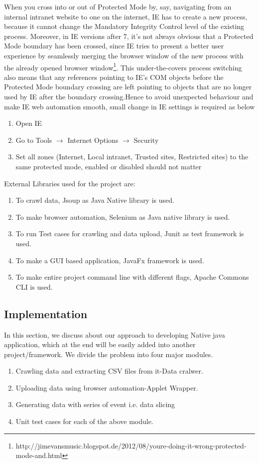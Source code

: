 \documentclass[article,type=msc,colorback,accentcolor=tud9c,twoside,11pt]{tudthesis}
\begin{document}
When you cross into or out of Protected Mode by, say, navigating from an internal intranet website to one on the internet, IE has to create a new process, because it cannot change the Mandatory Integrity Control level of the existing process. Moreover, in IE versions after 7, it's not always obvious that a Protected Mode boundary has been crossed, since IE tries to present a better user experience by seamlessly merging the browser window of the new process with the already opened browser window\footnote{http://jimevansmusic.blogspot.de/2012/08/youre-doing-it-wrong-protected-mode-and.html}. This under-the-covers process switching also means that any references pointing to IE's COM objects before the Protected Mode boundary crossing are left pointing to objects that are no longer used by IE after the boundary crossing.Hence to avoid unexpected behaviour and make IE web automation smooth, small change in IE settings is required as below
\begin{enumerate}
\item Open IE
\item Go to Tools $\rightarrow$ {Internet Options} $\rightarrow$ {Security}
\item Set all zones (Internet, Local intranet, Trusted sites, Restricted sites) to the same protected mode, enabled or disabled should not matter
\end{enumerate}
External Libraries used for the project are:
\begin{enumerate}
\item To crawl data, Jsoup as Java Native library is used.
\item To make browser automation, Selenium as Java native library is used.
\item To run Test cases for crawling and data upload, Junit as test framework is used. 
\item To make a GUI based application, JavaFx framework is used.
\item To make entire project command line with different flags, Apache Commons CLI is used. 
\end{enumerate}

\subsection{Implementation}
In this section, we discuss about our approach to developing Native java application, which at the end will be easily added into another project/framework. We divide the problem into four major modules.
\begin{enumerate}
	\item Crawling data and extracting CSV files from it-Data cralwer.
	\item Uploading data using browser automation-Applet Wrapper.
	\item Generating data with series of event i.e. data slicing
	\item Unit test cases for each of the above module.
	
\end{enumerate}
\end{document}
